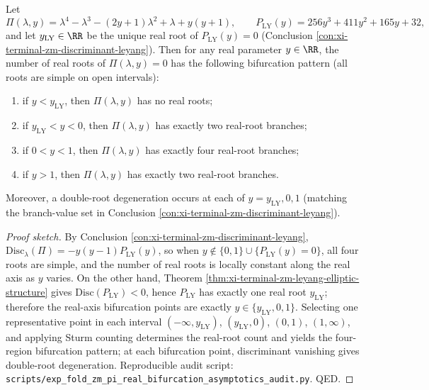 ﻿\begin{conclusion}\label{con:xi-terminal-zm-pi-real-root-bifurcation}
Let
\[
\Pi(\lambda,y)=\lambda^4-\lambda^3-(2y+1)\lambda^2+\lambda+y(y+1),
\qquad
P_{\mathrm{LY}}(y)=256y^3+411y^2+165y+32,
\]
and let \(y_{\mathrm{LY}}\in\RR\) be the unique real root of \(P_{\mathrm{LY}}(y)=0\) (Conclusion \ref{con:xi-terminal-zm-discriminant-leyang}).
Then for any real parameter \(y\in\RR\), the number of real roots of \(\Pi(\lambda,y)=0\) has the following bifurcation pattern (all roots are simple on open intervals):
\begin{enumerate}
  \item if \(y<y_{\mathrm{LY}}\), then \(\Pi(\lambda,y)\) has no real roots;
  \item if \(y_{\mathrm{LY}}<y<0\), then \(\Pi(\lambda,y)\) has exactly two real-root branches;
  \item if \(0<y<1\), then \(\Pi(\lambda,y)\) has exactly four real-root branches;
  \item if \(y>1\), then \(\Pi(\lambda,y)\) has exactly two real-root branches.
\end{enumerate}
Moreover, a double-root degeneration occurs at each of \(y=y_{\mathrm{LY}},0,1\) (matching the branch-value set in Conclusion \ref{con:xi-terminal-zm-discriminant-leyang}).
\end{conclusion}
\begin{proof}[Proof sketch]
By Conclusion \ref{con:xi-terminal-zm-discriminant-leyang},
\(
\mathrm{Disc}_{\lambda}(\Pi)=-y(y-1)P_{\mathrm{LY}}(y)
\),
so when \(y\notin\{0,1\}\cup\{P_{\mathrm{LY}}(y)=0\}\), all four roots are simple, and the number of real roots is locally constant along the real axis as \(y\) varies.
On the other hand, Theorem \ref{thm:xi-terminal-zm-leyang-elliptic-structure} gives \(\mathrm{Disc}(P_{\mathrm{LY}})<0\), hence \(P_{\mathrm{LY}}\) has exactly one real root \(y_{\mathrm{LY}}\);
therefore the real-axis bifurcation points are exactly \(y\in\{y_{\mathrm{LY}},0,1\}\).
Selecting one representative point in each interval \(( -\infty,y_{\mathrm{LY}} )\), \(( y_{\mathrm{LY}},0 )\), \((0,1)\), \((1,\infty)\), and applying Sturm counting determines the real-root count and yields the four-region bifurcation pattern; at each bifurcation point, discriminant vanishing gives double-root degeneration.
Reproducible audit script: \texttt{scripts/exp\_fold\_zm\_pi\_real\_bifurcation\_asymptotics\_audit.py}. QED.
\end{proof}

